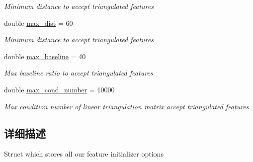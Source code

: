 \begin{DoxyCompactItemize}
\begin{DoxyCompactList}\small\item\em Minimum distance to accept triangulated features \end{DoxyCompactList}\item 
\mbox{\label{structov__core_1_1FeatureInitializerOptions_ad1bf58514d4539e5722cd8f6bdfba543}} 
double \hyperlink{structov__core_1_1FeatureInitializerOptions_ad1bf58514d4539e5722cd8f6bdfba543}{max\+\_\+dist} = 60
\begin{DoxyCompactList}\small\item\em Minimum distance to accept triangulated features \end{DoxyCompactList}\item 
\mbox{\label{structov__core_1_1FeatureInitializerOptions_a6f62408d17ff8e5ee4a76213f3348443}} 
double \hyperlink{structov__core_1_1FeatureInitializerOptions_a6f62408d17ff8e5ee4a76213f3348443}{max\+\_\+baseline} = 40
\begin{DoxyCompactList}\small\item\em Max baseline ratio to accept triangulated features \end{DoxyCompactList}\item 
\mbox{\label{structov__core_1_1FeatureInitializerOptions_a3205f827e3ba58f509435d08b369995c}} 
double \hyperlink{structov__core_1_1FeatureInitializerOptions_a3205f827e3ba58f509435d08b369995c}{max\+\_\+cond\+\_\+number} = 10000
\begin{DoxyCompactList}\small\item\em Max condition number of linear triangulation matrix accept triangulated features \end{DoxyCompactList}\end{DoxyCompactItemize}


\subsection{详细描述}
Struct which stores all our feature initializer options 